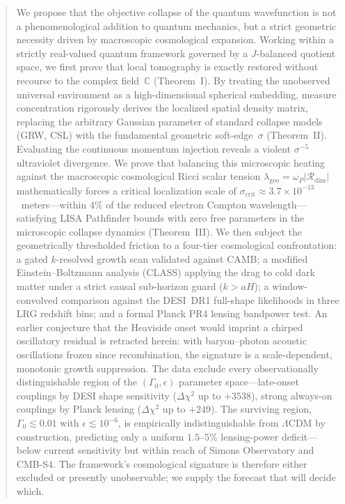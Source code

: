 \documentclass[aps,prd,twocolumn,superscriptaddress,nofootinbib]{revtex4-2}
\theoremstyle{definition}
\theoremstyle{remark}
\newcommand{\C}{\mathbb{C}}
\newcommand{\Rdim}{\mathcal{R}_{\mathrm{dim}}}
\newcommand{\sigcrit}{\sigma_{\mathrm{crit}}}
\newcommand{\lambdageo}{\lambda_{\mathrm{geo}}}
\newcommand{\omegaP}{\omega_P}
\begin{document}
\begin{abstract}
We propose that the objective collapse of the quantum wavefunction is not a
phenomenological addition to quantum mechanics, but a strict geometric
necessity driven by macroscopic cosmological expansion. Working within a
strictly real-valued quantum framework governed by a $J$-balanced quotient
space, we first prove that local tomography is exactly restored without
recourse to the complex field~$\C$ (Theorem~I). By treating the unobserved
universal environment as a high-dimensional spherical embedding, measure
concentration rigorously derives the localized spatial density matrix,
replacing the arbitrary Gaussian parameter of standard collapse models
(GRW, CSL) with the fundamental geometric soft-edge~$\sigma$ (Theorem~II).
Evaluating the continuous momentum injection reveals a violent
$\sigma^{-5}$ ultraviolet divergence. We prove that balancing this
microscopic heating against the macroscopic cosmological Ricci scalar
tension $\lambdageo = \omegaP |\Rdim|$ mathematically forces a critical
localization scale of $\sigcrit \approx 3.7 \times 10^{-13}$~meters---within
$4\%$ of the reduced electron Compton wavelength---satisfying LISA
Pathfinder bounds with zero free parameters in the microscopic collapse
dynamics (Theorem~III). We then subject the geometrically thresholded
friction to a four-tier cosmological confrontation: a gated $k$-resolved
growth scan validated against CAMB; a modified Einstein--Boltzmann
analysis (CLASS) applying the drag to cold dark matter under a strict
causal sub-horizon guard ($k > aH$); a window-convolved comparison
against the DESI~DR1 full-shape likelihoods in three LRG redshift bins;
and a formal Planck PR4 lensing bandpower test. An earlier conjecture
that the Heaviside onset would imprint a chirped oscillatory residual is
retracted herein: with baryon--photon acoustic oscillations frozen since
recombination, the signature is a scale-dependent, monotonic growth
suppression. The data exclude every observationally distinguishable
region of the $(\Gamma_0, \epsilon)$ parameter space---late-onset
couplings by DESI shape sensitivity ($\Delta\chi^2$ up to $+3538$),
strong always-on couplings by Planck lensing ($\Delta\chi^2$ up to
$+249$). The surviving region, $\Gamma_0 \lesssim 0.01$ with
$\epsilon \lesssim 10^{-6}$, is empirically indistinguishable from
$\Lambda$CDM by construction, predicting only a uniform $1.5$--$5\%$
lensing-power deficit---below current sensitivity but within reach of
Simons Observatory and CMB-S4. The framework's cosmological signature is
therefore either excluded or presently unobservable; we supply the
forecast that will decide which.
\end{abstract}
\end{document}
